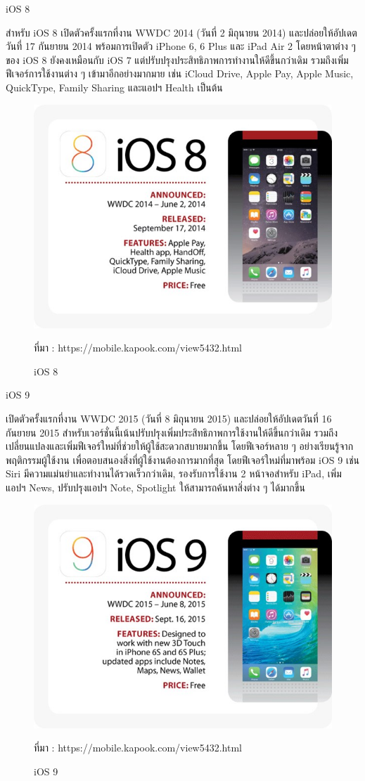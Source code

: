 	iOS 8 

	สำหรับ iOS 8 เปิดตัวครั้งแรกที่งาน WWDC 2014 (วันที่ 2 มิถุนายน 2014) และปล่อยให้อัปเดตวันที่ 17 กันยายน 2014 พร้อมการเปิดตัว iPhone 6, 6 Plus และ iPad Air 2 โดยหน้าตาต่าง ๆ ของ iOS 8 ยังคงเหมือนกับ iOS 7 แต่ปรับปรุงประสิทธิภาพการทำงานให้ดีขึ้นกว่าเดิม รวมถึงเพิ่มฟีเจอร์การใช้งานต่าง ๆ เข้ามาอีกอย่างมากมาย เช่น iCloud Drive, Apple Pay, Apple Music, QuickType, Family Sharing และแอปฯ Health เป็นต้น

	\begin{figure}[H]
		\centering
		\includegraphics[width=0.8\columnwidth]{Figures/2/iOS/iOS8}
		\caption{iOS 8}{ที่มา : https://mobile.kapook.com/view5432.html}
		\label{Fig:iosversion8}
	\end{figure}

	iOS 9 

	เปิดตัวครั้งแรกที่งาน WWDC 2015 (วันที่ 8 มิถุนายน 2015) และปล่อยให้อัปเดตวันที่ 16 กันยายน 2015 สำหรับเวอร์ชั่นนี้เน้นปรับปรุงเพิ่มประสิทธิภาพการใช้งานให้ดีขึ้นกว่าเดิม รวมถึงเปลี่ยนแปลงและเพิ่มฟีเจอร์ใหม่ที่ช่วยให้ผู้ใช้สะดวกสบายมากขึ้น โดยฟีเจอร์หลาย ๆ อย่างเรียนรู้จากพฤติกรรมผู้ใช้งาน เพื่อตอบสนองสิ่งที่ผู้ใช้งานต้องการมากที่สุด โดยฟีเจอร์ใหม่ที่มาพร้อม iOS 9 เช่น Siri มีความแม่นยำและทำงานได้รวดเร็วกว่าเดิม, รองรับการใช้งาน 2 หน้าจอสำหรับ iPad, เพิ่มแอปฯ News, ปรับปรุงแอปฯ Note, Spotlight ให้สามารถค้นหาสิ่งต่าง ๆ ได้มากขึ้น

	\begin{figure}[H]
		\centering
		\includegraphics[width=0.8\columnwidth]{Figures/2/iOS/iOS9}
		\caption{iOS 9}{ที่มา : https://mobile.kapook.com/view5432.html}
		\label{Fig:iosversion9}
	\end{figure}


